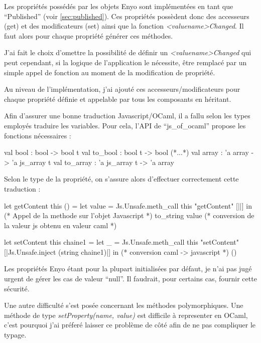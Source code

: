 \documentclass[11pt,a4paper]{report}
\begin{document}
Les propriétés possédés par les objets Enyo sont implémentées en tant que ``Published'' 
(voir \ref{sec:published}). Ces propriétés possèdent donc des accesseurs (get) et des modificateurs (set) ainsi
que la fonction \emph{<valuename>Changed}. Il faut alors pour chaque propriété générer ces méthodes.

J'ai fait le choix d'omettre la possibilité de définir un \emph{<valuename>Changed} qui peut cependant,
si la logique de l'application le nécessite, être remplacé par un simple appel de fonction au moment
de la modification de propriété.

Au niveau de l'implémentation, j'ai ajouté ces accesseurs/modificateurs pour chaque propriété définie 
et appelable par tous les composants en héritant.

Afin d'assurer une bonne traduction Javascript/OCaml, il a fallu selon les types employés traduire
les variables. Pour cela, l'API de ``js\_of\_ocaml'' propose les fonctions nécessaires :

\begin{OCaml}
  val bool : bool -> bool t
  val to_bool : bool t -> bool
  (*...*)
  val array : 'a array -> 'a js_array t
  val to_array : 'a js_array t -> 'a array
\end{OCaml}

Selon le type de la propriété, on s'assure alors d'effectuer correctement cette traduction :

\begin{OCaml}
  let getContent this () =
    let value = Js.Unsafe.meth_call 
                     this 
                     "getContent" 
                     [||] in (* Appel de la methode sur l'objet Javascript *)
    to_string value (* conversion de la valeur js obtenu en valeur caml *)
\end{OCaml}
\clearpage %
\begin{OCaml}
  let setContent this chaine1 =
    let _ = Js.Unsafe.meth_call 
                this 
                "setContent" 
                [|Js.Unsafe.inject (string chaine1)|] in (* conversion caml -> javascript *)
    ()
\end{OCaml}

Les propriétés Enyo étant pour la plupart initialisées par défaut, je n'ai pas jugé urgent
de gérer les cas de valeur ``null''. Il faudrait, pour certains cas, fournir cette sécurité.\medskip

Une autre difficulté s'est posée concernant les méthodes polymorphiques. Une méthode de type
\emph{setProperty(name, value)} est difficile à representer en OCaml, c'est pourquoi j'ai préferé
laisser ce problème de côté afin de ne pas compliquer le typage.
\end{document}
